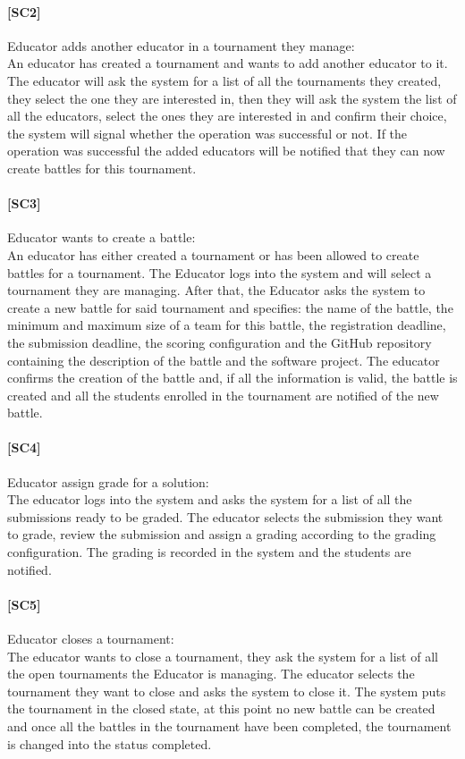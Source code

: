 \documentclass{article}
\begin{document}
\paragraph{[SC2]}Educator adds another educator in a tournament they manage:\\
An educator has created a tournament and wants to add another educator to it. The educator will ask the system for a list of all the tournaments they created, they select the one they are interested in, then they will ask the system the list of all the educators, select the ones they are interested in and confirm their choice, the system will signal whether the operation was successful or not. If the operation was successful the added educators will be notified that they can now create battles for this tournament.

\paragraph{[SC3]}Educator wants to create a battle:\\
An educator has either created a tournament or has been allowed to create battles for a tournament. The Educator logs into the system and will select a tournament they are managing. After that, the Educator asks the system to create a new battle for said tournament and specifies: the name of the battle, the minimum and maximum size of a team for this battle, the registration deadline, the submission deadline, the scoring configuration and the GitHub repository containing the description of the battle and the software project. The educator confirms the creation of the battle and, if all the information is valid, the battle is created and all the students enrolled in the tournament are notified of the new battle.

\paragraph{[SC4]}Educator assign grade for a solution:\\
The educator logs into the system and asks the system for a list of all the submissions ready to be graded. The educator selects the submission they want to grade, review the submission and assign a grading according to the grading configuration. The grading is recorded in the system and the students are notified.

\paragraph{[SC5]}Educator closes a tournament:\\
The educator wants to close a tournament, they ask the system for a list of all the open tournaments the Educator is managing. The educator selects the tournament they want to close and asks the system to close it. The system puts the tournament in the closed state, at this point no new battle can be created and once all the battles in the tournament have been completed, the tournament is changed into the status completed.
\end{document}
